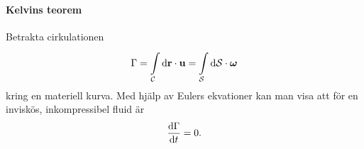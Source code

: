 \paragraph{Kelvins teorem}
Betrakta cirkulationen
\begin{align*}
	\Gamma = \int\limits_{\mathcal{C}}^{}\dd{\vb{r}}\cdot \vb{u} = \int\limits_{\mathcal{S}}^{}\dd{\vb{\mathcal{S}}}\cdot \vb*{\omega}
\end{align*}
kring en materiell kurva. Med hjälp av Eulers ekvationer kan man visa att för en inviskös, inkompressibel fluid är
\begin{align*}
	\dv{\Gamma}{t} = 0.
\end{align*}